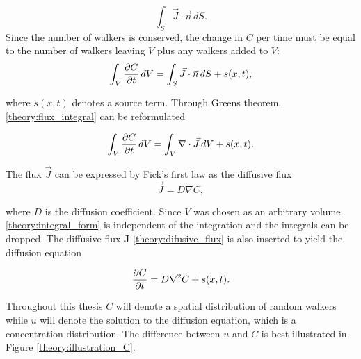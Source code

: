 \begin{equation}\label{theory:flux_integral}
 \int_S\vec{J}\cdot \vec{n}\,dS.
\end{equation}
Since the number of walkers is conserved, the change in $C$ per time must be equal to the number of walkers leaving $V$ plus any walkers added to $V$:
\begin{equation}\label{theory:diffusion_integral_form}
 \int_V \frac{\partial C}{\partial t}\,dV = \int_S\vec{J}\cdot \vec{n}\,dS + s(x,t),
\end{equation}

\noindent where $s(x,t)$ denotes a source term. 
Through Greens theorem, \eqref{theory:flux_integral} can be reformulated 

\begin{equation}\label{theory:integral_form}
 \int_V \frac{\partial C}{\partial t}\,dV = \int_V\nabla\cdot\vec{J}\,dV +s(x,t).
\end{equation}

\noindent The flux $\vec{J}$ can be expressed by Fick's first law as the diffusive flux 
\begin{equation}\label{theory:difusive_flux}
 \vec J = D\nabla C,
\end{equation}

\noindent where $D$ is the diffusion coefficient. Since $V$ was chosen as an arbitrary volume \eqref{theory:integral_form} is independent of the integration and the integrals can be dropped. 
The diffusive flux $\mathbf{J}$ \eqref{theory:difusive_flux} is also inserted to yield the diffusion equation

\begin{equation}\label{theory:diffusion_equation}
 \frac{\partial C}{\partial t} = D\nabla^2 C +s(x,t).
\end{equation}

\noindent Throughout this thesis $C$ will denote a spatial distribution of random walkers while $u$ will denote the solution to the diffusion equation, which is a concentration distribution. 
The difference between $u$ and $C$ is best illustrated in Figure \ref{theory:illustration_C}.

